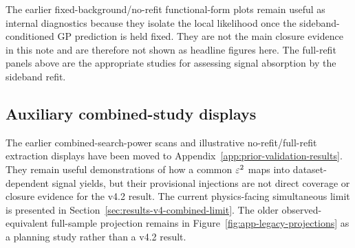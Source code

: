 \FloatBarrier

The earlier fixed-background/no-refit functional-form plots remain useful as internal
diagnostics because they isolate the local likelihood once the sideband-conditioned GP
prediction is held fixed. They are not the main closure evidence in this note and are
therefore not shown as headline figures here. The full-refit panels above are the
appropriate studies for assessing signal absorption by the sideband refit.

\subsection{Auxiliary combined-study displays}

The earlier combined-search-power scans and illustrative no-refit/full-refit extraction
displays have been moved to Appendix~\ref{app:prior-validation-results}. They remain
useful demonstrations of how a common $\varepsilon^2$ maps into dataset-dependent signal
yields, but their provisional injections are not direct coverage or closure evidence
for the v4.2 result. The current physics-facing simultaneous limit is presented
in Section~\ref{sec:results-v4-combined-limit}. The older observed-equivalent
full-sample projection remains in
Figure~\ref{fig:app-legacy-projections} as a planning study rather than a v4.2 result.
